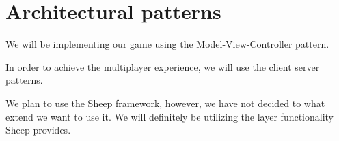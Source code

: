 \section{Architectural patterns} 
\label{architecturalpatterns}

We will be implementing our game using the Model-View-Controller pattern. 

In order to achieve the multiplayer experience, we will use the client server patterns.

We plan to use the Sheep framework, however, we have not decided to what extend we want to use it. We will definitely be utilizing the layer functionality Sheep provides.
